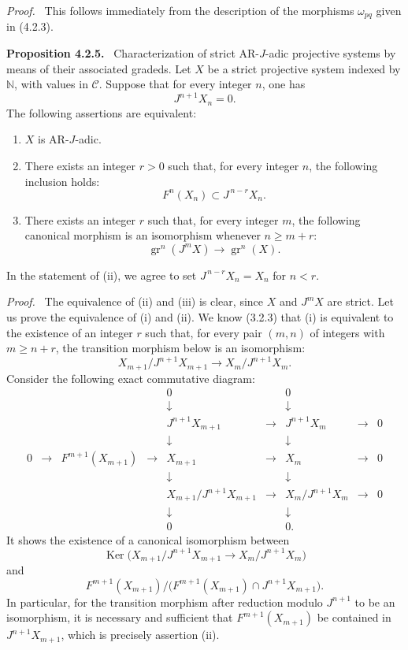 \documentclass[11pt]{article}
\newenvironment{statement}[1]{\par\medskip\noindent\textbf{#1.}\ }{\par\medskip}
\newenvironment{prooftext}[1][Proof]{\par\noindent\emph{#1.}\ }{\par\medskip}
\providecommand{\Ker}{\operatorname{Ker}}
\providecommand{\gr}{\operatorname{gr}}
\providecommand{\Ker}{\operatorname{Ker}}
\providecommand{\gr}{\operatorname{gr}}
\providecommand{\gr}{\operatorname{gr}}
\providecommand{\Ker}{\operatorname{Ker}}
\begin{document}
\begin{prooftext}
This follows immediately from the description of the morphisms \(\omega_{pq}\) given in (4.2.3).
\end{prooftext}

\begin{statement}{Proposition 4.2.5}
Characterization of strict AR-\(J\)-adic projective systems by means of their associated gradeds. Let \(X\) be a strict projective system indexed by \(\mathbb N\), with values in \(\mathcal C\). Suppose that for every integer \(n\), one has
\[
J^{n+1}X_n=0.
\]
The following assertions are equivalent:
\begin{enumerate}[label=\textup{(\roman*)}]
\item \(X\) is AR-\(J\)-adic.
\item There exists an integer \(r>0\) such that, for every integer \(n\), the following inclusion holds:
\[
F^n(X_n)\subset J^{\,n-r}X_n.
\]
\item There exists an integer \(r\) such that, for every integer \(m\), the following canonical morphism is an isomorphism whenever \(n\ge m+r\):
\[
\gr^n(J^mX)\longrightarrow \gr^n(X).
\]
\end{enumerate}
In the statement of (ii), we agree to set \(J^{\,n-r}X_n=X_n\) for \(n<r\).
\end{statement}

\begin{prooftext}
The equivalence of (ii) and (iii) is clear, since \(X\) and \(J^mX\) are strict. Let us prove the equivalence of (i) and (ii). We know (3.2.3) that (i) is equivalent to the existence of an integer \(r\) such that, for every pair \((m,n)\) of integers with \(m\ge n+r\), the transition morphism below is an isomorphism:
\[
X_{m+1}/J^{n+1}X_{m+1}\longrightarrow X_m/J^{n+1}X_m.
\]
Consider the following exact commutative diagram:
\[
\begin{array}{ccccccccccc}
&&&&0&&0\\
&&&&\downarrow&&\downarrow\\
&&&&J^{n+1}X_{m+1}&\longrightarrow&J^{n+1}X_m&\longrightarrow&0\\
&&&&\downarrow&&\downarrow\\
0&\longrightarrow&F^{m+1}(X_{m+1})&\longrightarrow&X_{m+1}&\longrightarrow&X_m&\longrightarrow&0\\
&&&&\downarrow&&\downarrow\\
&&&&X_{m+1}/J^{n+1}X_{m+1}&\longrightarrow&X_m/J^{n+1}X_m&\longrightarrow&0\\
&&&&\downarrow&&\downarrow\\
&&&&0&&0 .
\end{array}
\]
It shows the existence of a canonical isomorphism between
\[
\Ker\bigl(X_{m+1}/J^{n+1}X_{m+1}
       \longrightarrow X_m/J^{n+1}X_m\bigr)
\]
and
\[
F^{m+1}(X_{m+1})/
\bigl(F^{m+1}(X_{m+1})\cap J^{n+1}X_{m+1}\bigr).
\]
In particular, for the transition morphism after reduction modulo \(J^{n+1}\) to be an isomorphism, it is necessary and sufficient that \(F^{m+1}(X_{m+1})\) be contained in \(J^{n+1}X_{m+1}\), which is precisely assertion (ii).
\end{prooftext}
\end{document}
